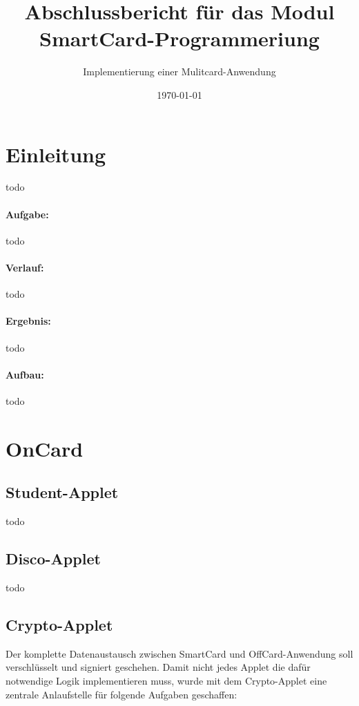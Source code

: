 
\title{Abschlussbericht für das Modul SmartCard-Programmeriung}
\subtitle{Implementierung einer Mulitcard-Anwendung\vspace{1cm}}

\author{}
\date{\today}

\maketitle

\tableofcontents
\pagebreak

\section{Einleitung}
todo

\paragraph{Aufgabe:}
todo

\paragraph{Verlauf:}
todo

\paragraph{Ergebnis:}
todo

\paragraph{Aufbau:}
todo

\section{OnCard}
\subsection{Student-Applet}
todo
\subsection{Disco-Applet}
todo
\subsection{Crypto-Applet}
Der komplette Datenaustausch zwischen SmartCard und OffCard-Anwendung soll verschlüsselt und signiert geschehen. 
Damit nicht jedes Applet die dafür notwendige Logik implementieren muss, wurde mit dem Crypto-Applet eine zentrale Anlaufstelle für folgende Aufgaben geschaffen:

